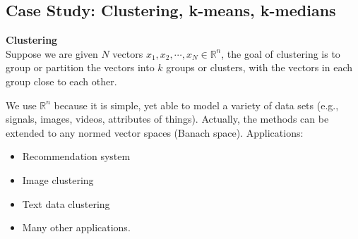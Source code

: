 \documentclass{article}
\begin{document}
\pagebreak
\subsection*{Case Study: Clustering, k-means, k-medians}
\textbf{Clustering} \\
Suppose we are given $N$ vectors $x_1, x_2, \cdots, x_N \in \mathbb{R}^{n}$, the goal of clustering is to group or partition the vectors into $k$ groups or clusters, with the vectors in each group close to each other.

\begin{center}
\end{center}

We use $\mathbb{R}^{n}$ because it is simple, yet able to model a variety of data sets (e.g., signals, images, videos, attributes of things). Actually, the methods can be extended to any normed vector spaces (Banach space).
Applications:
\begin{itemize}
    \item Recommendation system
    \item Image clustering
    \item Text data clustering
    \item Many other applications.
\end{itemize}
\end{document}
